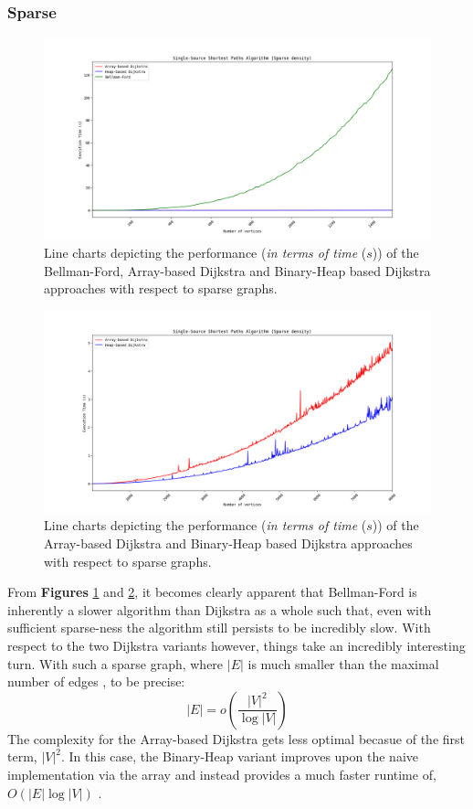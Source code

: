 \documentclass[a4paper, 12pt]{report}
\theoremstyle{definition}
\begin{document}
\subsubsection{Sparse}

\begin{figure}[H]
  \centering
  \includegraphics[width=5.5in]{all_sparse_01.png}
  \caption{Line charts depicting the performance (\emph{in terms of time} (\(s\))) of the Bellman-Ford, Array-based Dijkstra and Binary-Heap based Dijkstra approaches with respect to sparse graphs.}
  \label{fig10:sparse1}
\end{figure}

\begin{figure}[H]
  \centering
  \includegraphics[width=5.5in]{all_sparse_02.png}
  \caption{Line charts depicting the performance (\emph{in terms of time} (\(s\))) of the Array-based Dijkstra and Binary-Heap based Dijkstra approaches with respect to sparse graphs.}
  \label{fig11:sparse2}
\end{figure}

From \textbf{Figures} \ref{fig10:sparse1} and \ref{fig11:sparse2}, it becomes clearly apparent that Bellman-Ford is inherently a slower algorithm than Dijkstra as a whole such that, even with sufficient sparse-ness
the algorithm still persists to be incredibly slow. With respect to the two Dijkstra variants however, things take an incredibly interesting turn. With such a sparse graph, where \(|E|\) is much smaller than the maximal
number of edges \cite{cormenBk}, to be precise:
\begin{equation}
  |E| = o(\frac{|V|^{2}}{\log |V|})
\end{equation}
The complexity for the Array-based Dijkstra gets less optimal becasue of the first term, \(|V|^{2}\). In this case, the Binary-Heap variant improves upon the naive implementation via the array and instead provides
a much faster runtime of, \(O(|E|\log |V|)\) \cite{cormenBk}.  
\end{document}
